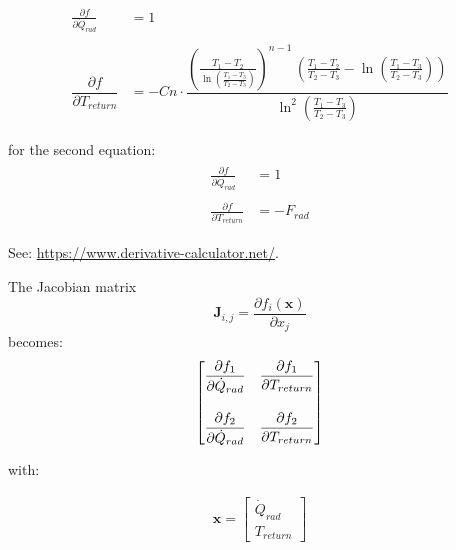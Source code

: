 \begin{equation}
	\begin{aligned}
		\begin{matrix}
			\frac{\partial f}{\partial \dot{Q}_{rad}} &= 1 \\ 
			\\
			\dfrac{\partial f}{\partial T_{return}} &= -Cn\cdot \dfrac{\left(\frac{T_1-T_2}{\ln\left(\frac{T_1-T_3}{T_2-T_3}\right)}\right)^{n-1}\,\left(\frac{T_1-T_2}{T_2-T_3}-\ln\left(\frac{T_1-T_3}{T_2-T_3}\right)\right)}{\ln^2\left(\frac{T_1-T_3}{T_2-T_3}\right)} \\ \\
		\end{matrix}
	\end{aligned}
\end{equation} 
for the second equation:
\begin{equation}
	\begin{aligned}
		\begin{matrix}
			\frac{\partial f}{\partial \dot{Q}_{rad}} &= 1 \\ \\
			\frac{\partial f}{\partial T_{return}} &= -F_{rad}
		\end{matrix}
	\end{aligned}
\end{equation} 

See: \url{https://www.derivative-calculator.net/}.

The Jacobian matrix 
$$\mathbf{J}_{i,j}=\dfrac{\partial f_{i}(\mathbf{x})}{\partial x_{j}}$$
becomes:
\begin{equation}
	\begin{aligned}
		\begin{bmatrix}
			\dfrac{\partial f_1}{\partial \dot{Q}_{rad}} & \dfrac{\partial f_1}{\partial T_{return}} \\ 
			\vspace{2pt} \\
			\dfrac{\partial f_2}{\partial \dot{Q}_{rad}} & \dfrac{\partial f_2}{\partial T_{return}}
		\end{bmatrix}
	\end{aligned}
\end{equation} 

with:

\begin{equation}
	\begin{aligned}
		\mathbf{x} =
		\begin{bmatrix}
			\dot{Q}_{rad} \\ 
			T_{return}
		\end{bmatrix}
	\end{aligned}
\end{equation}

